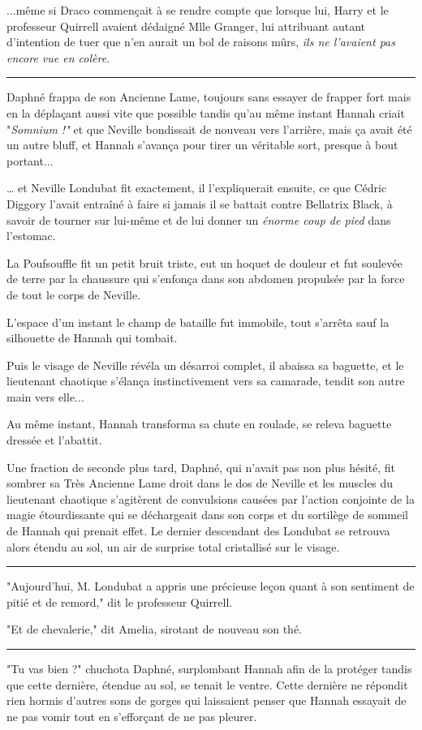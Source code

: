 ...même si Draco commençait à se rendre compte que lorsque lui, Harry et le professeur Quirrell avaient dédaigné Mlle Granger, lui attribuant autant d'intention de tuer que n'en aurait un bol de raisons mûrs, \emph{ils ne l'avaient pas encore vue en colère.} 
\par\noindent\rule{\textwidth}{0.4pt}
Daphné frappa de son Ancienne Lame, toujours sans essayer de frapper fort mais en la déplaçant aussi vite que possible tandis qu'au même instant Hannah criait "\emph{Somnium !"}  et que Neville bondissait de nouveau vers l'arrière, mais ça avait été un autre bluff, et Hannah s'avança pour tirer un véritable sort, presque à bout portant...

… et Neville Londubat fit exactement, il l'expliquerait ensuite, ce que Cédric Diggory l'avait entraîné à faire si jamais il se battait contre Bellatrix Black, à savoir de tourner sur lui-même et de lui donner un \emph{énorme coup de pied}  dans l'estomac.

La Poufsouffle fit un petit bruit triste, eut un hoquet de douleur et fut soulevée de terre par la chaussure qui s'enfonça dans son abdomen propulsée par la force de tout le corps de Neville.

L'espace d'un instant le champ de bataille fut immobile, tout s'arrêta sauf la silhouette de Hannah qui tombait.

Puis le visage de Neville révéla un désarroi complet, il abaissa sa baguette, et le lieutenant chaotique s'élança instinctivement vers sa camarade, tendit son autre main vers elle...

Au même instant, Hannah transforma sa chute en roulade, se releva baguette dressée et l'abattit.

Une fraction de seconde plus tard, Daphné, qui n'avait pas non plus hésité, fit sombrer sa Très Ancienne Lame droit dans le dos de Neville et les muscles du lieutenant chaotique s'agitèrent de convulsions causées par l'action conjointe de la magie étourdissante qui se déchargeait dans son corps et du sortilège de sommeil de Hannah qui prenait effet. Le dernier descendant des Londubat se retrouva alors étendu au sol, un air de surprise total cristallisé sur le visage.
\par\noindent\rule{\textwidth}{0.4pt}
"Aujourd'hui, M. Londubat a appris une précieuse leçon quant à son sentiment de pitié et de remord," dit le professeur Quirrell.

"Et de chevalerie," dit Amelia, sirotant de nouveau son thé.
\par\noindent\rule{\textwidth}{0.4pt}
"Tu vas bien ?" chuchota Daphné, surplombant Hannah afin de la protéger tandis que cette dernière, étendue au sol, se tenait le ventre. Cette dernière ne répondit rien hormis d'autres sons de gorges qui laissaient penser que Hannah essayait de ne pas vomir tout en s'efforçant de ne pas pleurer.

